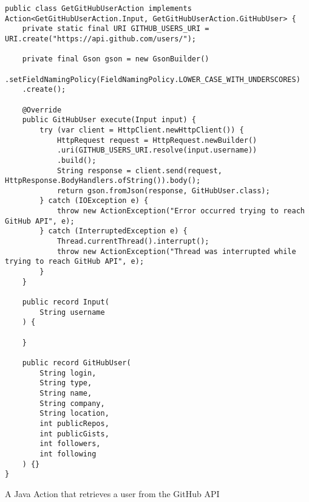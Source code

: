 \begin{listing}[H]
\begin{verbatim}
public class GetGitHubUserAction implements Action<GetGitHubUserAction.Input, GetGitHubUserAction.GitHubUser> {
    private static final URI GITHUB_USERS_URI = URI.create("https://api.github.com/users/");
    
    private final Gson gson = new GsonBuilder()
    .setFieldNamingPolicy(FieldNamingPolicy.LOWER_CASE_WITH_UNDERSCORES)
    .create();
    
    @Override
    public GitHubUser execute(Input input) {
        try (var client = HttpClient.newHttpClient()) {
            HttpRequest request = HttpRequest.newBuilder()
            .uri(GITHUB_USERS_URI.resolve(input.username))
            .build();
            String response = client.send(request, HttpResponse.BodyHandlers.ofString()).body();
            return gson.fromJson(response, GitHubUser.class);
        } catch (IOException e) {
            throw new ActionException("Error occurred trying to reach GitHub API", e);
        } catch (InterruptedException e) {
            Thread.currentThread().interrupt();
            throw new ActionException("Thread was interrupted while trying to reach GitHub API", e);
        }
    }
    
    public record Input(
        String username
    ) {
        
    }
    
    public record GitHubUser(
        String login,
        String type,
        String name,
        String company,
        String location,
        int publicRepos,
        int publicGists,
        int followers,
        int following
    ) {}
}
\end{verbatim}
\caption{A Java Action that retrieves a user from the GitHub API}
\end{listing}

